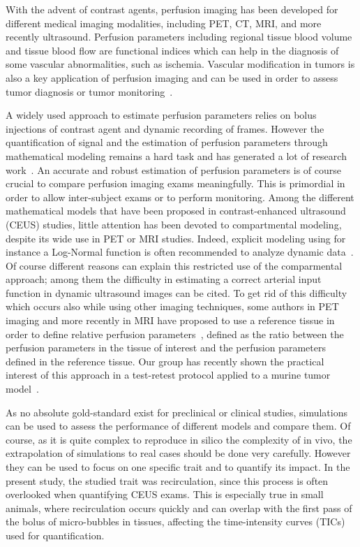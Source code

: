 With the advent of contrast agents, perfusion imaging has been developed for different medical imaging modalities, including PET, CT, MRI, and more recently ultrasound. Perfusion parameters including regional tissue blood volume and tissue blood flow are functional indices which can help in the  diagnosis of some vascular abnormalities, such as ischemia. Vascular modification in tumors is also a key application of perfusion imaging and can be used in order to assess tumor diagnosis or tumor monitoring~\cite{Dietrich:2012kw}. 

A widely used approach to estimate perfusion parameters relies on bolus injections of contrast agent and dynamic recording of frames. However the quantification of signal and the estimation of perfusion parameters through mathematical modeling remains a hard task and has generated a lot of research work~\cite{Turco:2016}. An accurate and robust estimation of perfusion parameters is of course crucial to compare perfusion imaging exams meaningfully. This is primordial in order to allow inter-subject exams or to perform monitoring. 
Among the different mathematical models that have been proposed in contrast-enhanced ultrasound (CEUS) studies, little attention has been devoted to compartmental modeling, despite its wide use in PET or MRI studies. Indeed, explicit modeling using for instance a Log-Normal function is often recommended to analyze dynamic data~\cite{Strouthos2010it,Dietrich:2012kw}.
Of course different reasons can explain this restricted use of the comparmental approach; among them the difficulty in estimating a correct arterial input function in dynamic ultrasound images can be cited. To get rid of this difficulty which occurs also while using other imaging techniques, some authors in PET imaging and more recently in MRI have proposed to use a reference tissue in order to define relative perfusion parameters~\cite{Yankeelov2005de,CardenasRodriguez2013em}, defined as the ratio between the perfusion parameters in the tissue of interest and the perfusion parameters defined in the reference tissue. Our group has recently shown the practical interest of this approach in a test-retest protocol applied to a murine tumor model~\cite{Doury2016fi,Doury2017wn}. 

As no absolute gold-standard exist for preclinical or clinical studies, simulations can be used to assess the performance of different models and compare them. Of course, as it is quite complex to reproduce in silico the complexity of in vivo, the extrapolation of simulations to real cases should be done very carefully. However they can be used to focus on one specific trait and to quantify its impact. In the present study, the studied trait was recirculation, since this process is often overlooked when quantifying CEUS exams. This is especially true in small animals, where recirculation occurs quickly and can overlap with the first pass of the bolus of micro-bubbles in tissues, affecting the time-intensity curves (TICs) used for quantification.

